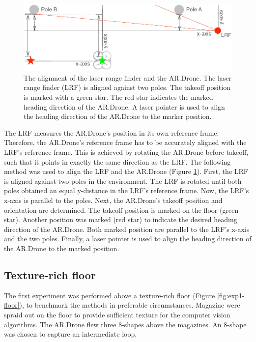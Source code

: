 \begin{figure}[htb]
\centering
\includegraphics[width=13cm]{images/exp1-floorplan-align.pdf}
\caption{The alignment of the laser range finder and the AR.Drone. The laser range finder (LRF) is aligned against two poles. The takeoff position is marked with a green star. The red star indicates the marked heading direction of the AR.Drone. A laser pointer is used to align the heading direction of the AR.Drone to the marker position.}
\label{fig:exp1-floorplan-align}
\end{figure}

The LRF measures the AR.Drone's position in its own reference frame.
Therefore, the AR.Drone's reference frame has to be accurately aligned with the LRF's reference frame.
This is achieved by rotating the AR.Drone before takeoff, such that it points in exactly the same direction as the LRF.
The following method was used to align the LRF and the AR.Drone (Figure \ref{fig:exp1-floorplan-align}).
First, the LRF is aligned against two poles in the environment.
The LRF is rotated until both poles obtained an equal y-distance in the LRF's reference frame.
Now, the LRF's x-axis is parallel to the poles.
Next, the AR.Drone's takeoff position and orientation are determined.
The takeoff position is marked on the floor (green star).
Another position was marked (red star) to indicate the desired heading direction of the AR.Drone.
Both marked position are parallel to the LRF's x-axis and the two poles.
Finally, a laser pointer is used to align the heading direction of the AR.Drone to the marked position.





\subsection{Texture-rich floor}
\label{sec:exp1-texture-rich}
The first experiment was performed above a texture-rich floor (Figure \ref{fig:exp1-floor}), to benchmark the methods in preferable circumstances.
Magazine were spraid out on the floor to provide sufficient texture for the computer vision algorithms.
The AR.Drone flew three 8-shapes above the magazines.
An 8-shape was chosen to capture an intermediate loop.

